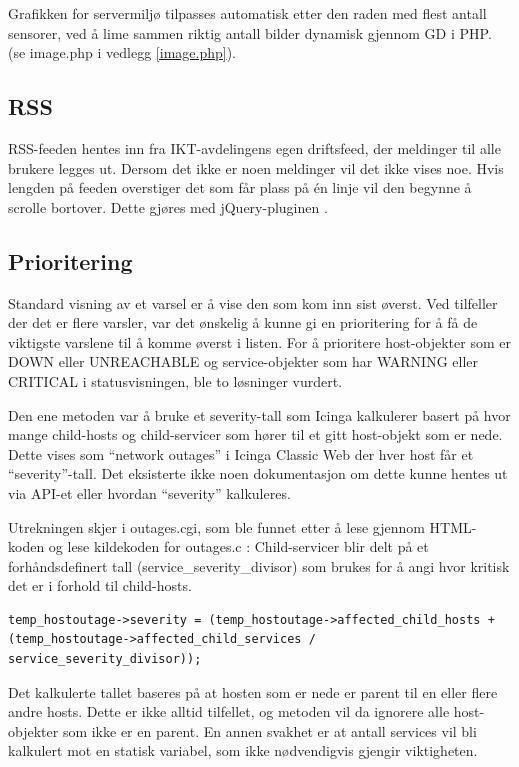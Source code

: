 Grafikken for servermiljø tilpasses automatisk etter den raden med flest antall sensorer, ved å lime sammen riktig antall bilder dynamisk gjennom GD i PHP. (se image.php i vedlegg \ref{image.php}).

\subsection{RSS}

RSS-feeden hentes inn fra IKT-avdelingens egen driftsfeed, der meldinger til alle brukere legges ut. Dersom det ikke er noen meldinger vil det ikke vises noe. Hvis lengden på feeden overstiger det som får plass på én linje vil den begynne å scrolle bortover. Dette gjøres med jQuery-pluginen \cite{jqmarquee}.

\subsection{Prioritering}

Standard visning av et varsel er å vise den som kom inn sist øverst. Ved tilfeller der det er flere varsler, var det ønskelig å kunne gi en prioritering for å få de viktigste varslene til å komme øverst i listen. For å prioritere host-objekter som er DOWN eller UNREACHABLE og service-objekter som har WARNING eller CRITICAL i statusvisningen, ble to løsninger vurdert. 

Den ene metoden var å bruke et severity-tall som Icinga kalkulerer basert på hvor mange child-hosts og child-servicer som hører til et gitt host-objekt som er nede. Dette vises som “network outages” i Icinga Classic Web der hver host får et “severity”-tall. Det eksisterte ikke noen dokumentasjon om dette kunne hentes ut via API-et eller hvordan “severity” kalkuleres. 

Utrekningen skjer i outages.cgi, som ble funnet etter å lese gjennom HTML-koden og lese kildekoden for outages.c \cite{dnsmichi} : 
Child-servicer blir delt på et forhåndsdefinert tall (service\_severity\_divisor) som brukes for å angi hvor kritisk det er i forhold til child-hosts.

\begin{lstlisting}
temp_hostoutage->severity = (temp_hostoutage->affected_child_hosts + (temp_hostoutage->affected_child_services / service_severity_divisor));
\end{lstlisting}

Det kalkulerte tallet baseres på at hosten som er nede er parent til en eller flere andre hosts. Dette er ikke alltid tilfellet, og metoden vil da ignorere alle host-objekter som ikke er en parent. En annen svakhet er at antall services vil bli kalkulert mot en statisk variabel, som ikke nødvendigvis gjengir viktigheten.


